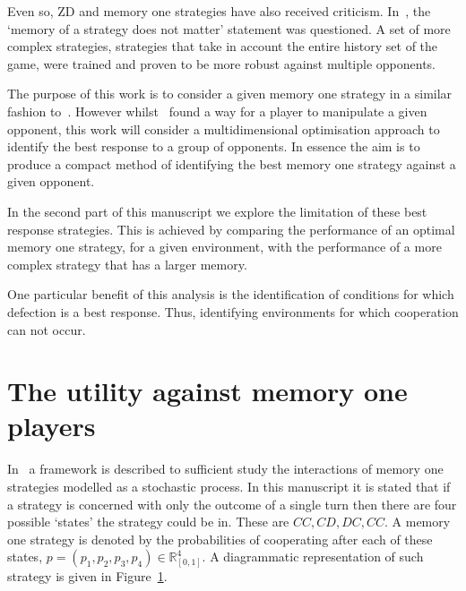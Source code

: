 \documentclass[10pt]{article}
\newcommand{\R}{\mathbb{R}}
\begin{document}
Even so, ZD and memory one strategies have also received criticism. In~\cite{Harper2015},
the `memory of a strategy does not matter' statement was questioned. A set of more
complex strategies, strategies that take in account the entire history set of the
game, were trained and proven to be more robust against multiple opponents.

The purpose of this work is to consider a given memory one strategy 
in a similar fashion to~\cite{Press2012}. However whilst~\cite{Press2012} found
a way for a player to manipulate a given opponent, this work will consider a multidimensional
optimisation approach to identify the best response to a group of opponents. In
essence the aim is to produce a compact method of identifying the best memory one
strategy against a given opponent.

In the second part of this manuscript we explore the limitation of these best response
strategies. This is achieved by comparing the performance of an optimal
memory one strategy, for a given environment, with the performance of a more complex
strategy that has a larger memory.

One particular benefit of this analysis is the identification of conditions for
which defection is a best response. Thus, identifying environments for which
cooperation can not occur.

\section{The utility against memory one players}\label{section:utility_against_mem_one}

In~\cite{Press2012} a framework is described to sufficient study the interactions
of memory one strategies modelled as a stochastic process. In this manuscript it
is stated that if a strategy is concerned with only the outcome of a single turn
then there are four possible `states' the strategy could be in. These are
\(CC, CD, DC,CC\). A memory one strategy is denoted by the probabilities of
cooperating after each of these states, \(p=(p_1, p_2, p_3, p_4) \in \R_{[0,1]} ^ 4\).
A diagrammatic representation of such strategy is given in Figure~\ref{fig:diagram_mem_one}.

\begin{figure}
    \centering
    \begin{subfigure}{0.45\textwidth}
        \centering
        
        \label{fig:diagram_mem_one}
    \end{subfigure}
    \begin{subfigure}{0.45\textwidth}
        \centering
        
        \label{fig:markov_chain}
    \end{subfigure}
\end{figure}
\end{document}
